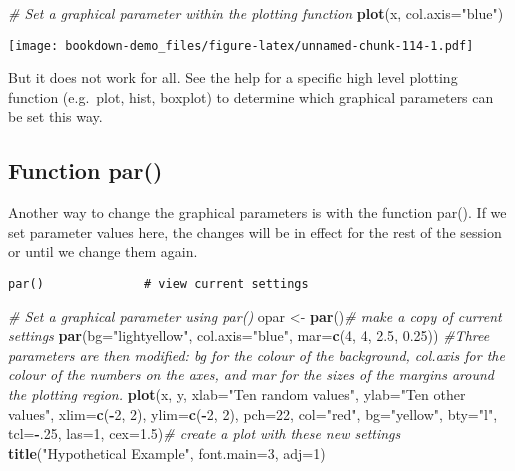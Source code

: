 \documentclass[]{book}
\newenvironment{Shaded}{\begin{snugshade}}{\end{snugshade}}
\newcommand{\KeywordTok}[1]{\textcolor[rgb]{0.13,0.29,0.53}{\textbf{#1}}}
\newcommand{\DataTypeTok}[1]{\textcolor[rgb]{0.13,0.29,0.53}{#1}}
\newcommand{\DecValTok}[1]{\textcolor[rgb]{0.00,0.00,0.81}{#1}}
\newcommand{\FloatTok}[1]{\textcolor[rgb]{0.00,0.00,0.81}{#1}}
\newcommand{\StringTok}[1]{\textcolor[rgb]{0.31,0.60,0.02}{#1}}
\newcommand{\CommentTok}[1]{\textcolor[rgb]{0.56,0.35,0.01}{\textit{#1}}}
\newcommand{\OperatorTok}[1]{\textcolor[rgb]{0.81,0.36,0.00}{\textbf{#1}}}
\newcommand{\NormalTok}[1]{#1}
\theoremstyle{definition}
\theoremstyle{definition}
\theoremstyle{definition}
\theoremstyle{remark}
\begin{document}
\begin{Shaded}
\begin{Highlighting}[]
\CommentTok{# Set a graphical parameter within the plotting function }
\KeywordTok{plot}\NormalTok{(x, }\DataTypeTok{col.axis=}\StringTok{"blue"}\NormalTok{)}
\end{Highlighting}
\end{Shaded}

\texttt{[image: bookdown-demo\_files/figure-latex/unnamed-chunk-114-1.pdf]}

But it does not work for all. See the help for a specific high level
plotting function (e.g.~plot, hist, boxplot) to determine which
graphical parameters can be set this way.

\subsection{Function par()}\label{function-par}

Another way to change the graphical parameters is with the function
par(). If we set parameter values here, the changes will be in effect
for the rest of the session or until we change them again.

\begin{verbatim}
par()              # view current settings
\end{verbatim}

\begin{Shaded}
\begin{Highlighting}[]
\CommentTok{# Set a graphical parameter using par()}
\NormalTok{opar <-}\StringTok{ }\KeywordTok{par}\NormalTok{()}\CommentTok{# make a copy of current settings}
\KeywordTok{par}\NormalTok{(}\DataTypeTok{bg=}\StringTok{"lightyellow"}\NormalTok{, }\DataTypeTok{col.axis=}\StringTok{"blue"}\NormalTok{, }\DataTypeTok{mar=}\KeywordTok{c}\NormalTok{(}\DecValTok{4}\NormalTok{, }\DecValTok{4}\NormalTok{, }\FloatTok{2.5}\NormalTok{, }\FloatTok{0.25}\NormalTok{)) }\CommentTok{#Three parameters are then modified: bg for the colour of the background, col.axis for the colour of the numbers on the axes, and mar for the sizes of the margins around the plotting region. }
\KeywordTok{plot}\NormalTok{(x, y, }\DataTypeTok{xlab=}\StringTok{"Ten random values"}\NormalTok{, }\DataTypeTok{ylab=}\StringTok{"Ten other values"}\NormalTok{,}
\DataTypeTok{xlim=}\KeywordTok{c}\NormalTok{(}\OperatorTok{-}\DecValTok{2}\NormalTok{, }\DecValTok{2}\NormalTok{), }\DataTypeTok{ylim=}\KeywordTok{c}\NormalTok{(}\OperatorTok{-}\DecValTok{2}\NormalTok{, }\DecValTok{2}\NormalTok{), }\DataTypeTok{pch=}\DecValTok{22}\NormalTok{, }\DataTypeTok{col=}\StringTok{"red"}\NormalTok{, }\DataTypeTok{bg=}\StringTok{"yellow"}\NormalTok{,}
\DataTypeTok{bty=}\StringTok{"l"}\NormalTok{, }\DataTypeTok{tcl=}\OperatorTok{-}\NormalTok{.}\DecValTok{25}\NormalTok{, }\DataTypeTok{las=}\DecValTok{1}\NormalTok{, }\DataTypeTok{cex=}\FloatTok{1.5}\NormalTok{)}\CommentTok{# create a plot with these new settings }
\KeywordTok{title}\NormalTok{(}\StringTok{"Hypothetical Example"}\NormalTok{, }\DataTypeTok{font.main=}\DecValTok{3}\NormalTok{, }\DataTypeTok{adj=}\DecValTok{1}\NormalTok{) }
\end{Highlighting}
\end{Shaded}
\end{document}
